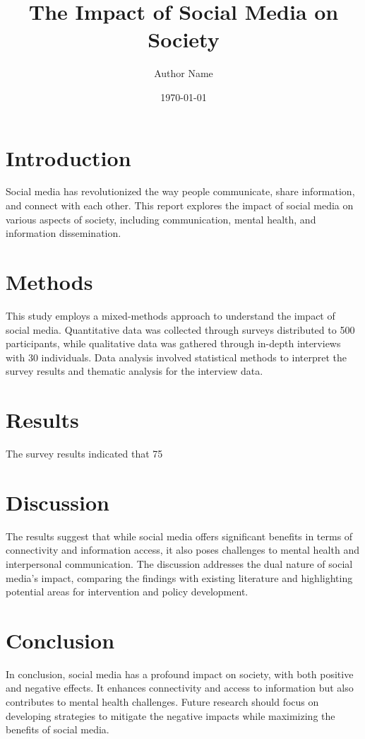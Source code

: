 \documentclass{report}
\title{The Impact of Social Media on Society}
\author{Author Name}
\date{\today}
\begin{document}
\maketitle

\tableofcontents

\chapter{Introduction}
Social media has revolutionized the way people communicate, share information, and connect with each other. This report explores the impact of social media on various aspects of society, including communication, mental health, and information dissemination.

\chapter{Methods}
This study employs a mixed-methods approach to understand the impact of social media. Quantitative data was collected through surveys distributed to 500 participants, while qualitative data was gathered through in-depth interviews with 30 individuals. Data analysis involved statistical methods to interpret the survey results and thematic analysis for the interview data.

\chapter{Results}
The survey results indicated that 75%

\chapter{Discussion}
The results suggest that while social media offers significant benefits in terms of connectivity and information access, it also poses challenges to mental health and interpersonal communication. The discussion addresses the dual nature of social media's impact, comparing the findings with existing literature and highlighting potential areas for intervention and policy development.

\chapter{Conclusion}
In conclusion, social media has a profound impact on society, with both positive and negative effects. It enhances connectivity and access to information but also contributes to mental health challenges. Future research should focus on developing strategies to mitigate the negative impacts while maximizing the benefits of social media.
\end{document}

